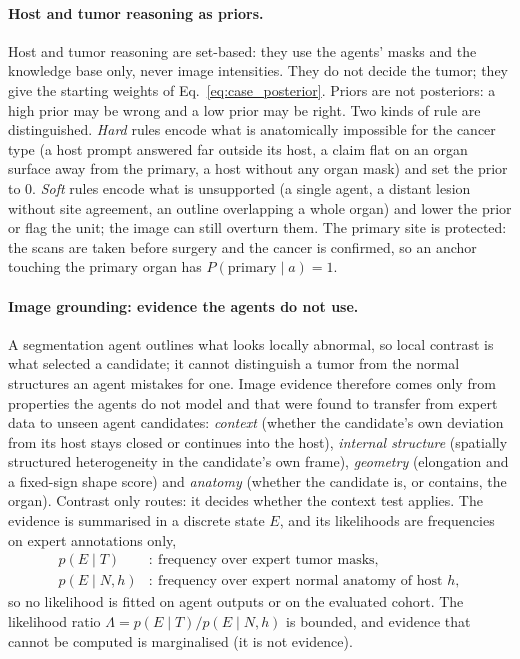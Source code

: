 \documentclass[fleqn,10pt]{olplainarticle}
\begin{document}
\paragraph{Host and tumor reasoning as priors.}
Host and tumor reasoning are set-based: they use the agents' masks and the knowledge base only, never image intensities.
They do not decide the tumor; they give the starting weights of Eq.~\eqref{eq:case_posterior}. Priors are not
posteriors: a high prior may be wrong and a low prior may be right. Two kinds of rule are distinguished. \emph{Hard} rules
encode what is anatomically impossible for the cancer type (a host prompt answered far outside its host, a claim flat on
an organ surface away from the primary, a host without any organ mask) and set the prior to $0$. \emph{Soft} rules encode
what is unsupported (a single agent, a distant lesion without site agreement, an outline overlapping a whole organ) and
lower the prior or flag the unit; the image can still overturn them. The primary site is protected: the scans are taken
before surgery and the cancer is confirmed, so an anchor touching the primary organ has $P(\text{primary}\mid a)=1$.

\paragraph{Image grounding: evidence the agents do not use.}
A segmentation agent outlines what looks locally abnormal, so local contrast is what selected a candidate; it cannot
distinguish a tumor from the normal structures an agent mistakes for one. Image evidence therefore comes only from
properties the agents do not model and that were found to transfer from expert data to unseen agent candidates:
\emph{context} (whether the candidate's own deviation from its host stays closed or continues into the host),
\emph{internal structure} (spatially structured heterogeneity in the candidate's own frame), \emph{geometry} (elongation
and a fixed-sign shape score) and \emph{anatomy} (whether the candidate is, or contains, the organ). Contrast only routes:
it decides whether the context test applies. The evidence is summarised in a discrete state $E$, and its likelihoods are
frequencies on expert annotations only,
\begin{equation}
\label{eq:likelihoods}
\begin{aligned}
p(E\mid T)&:\ \text{frequency over expert tumor masks},\\
p(E\mid N,h)&:\ \text{frequency over expert normal anatomy of host }h,
\end{aligned}
\end{equation}
so no likelihood is fitted on agent outputs or on the evaluated cohort. The likelihood ratio
$\Lambda=p(E\mid T)/p(E\mid N,h)$ is bounded, and evidence that cannot be computed is marginalised (it is not evidence).
\end{document}
